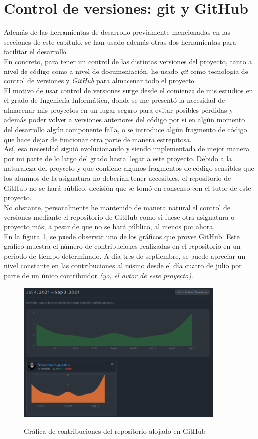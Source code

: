 \section{Control de versiones: git y GitHub}

Además de las herramientas de desarrollo previamente mencionadas en las secciones de este capítulo, se han usado además otras dos herramientas para facilitar el desarrollo.\\

En concreto, para tener un control de las distintas versiones del proyecto, tanto a nivel de código como a nivel de documentación, he usado \textit{git} como tecnología de control de versiones y \textit{GitHub} para almacenar todo el proyecto.\\

El motivo de usar control de versiones surge desde el comienzo de mis estudios en el grado de Ingeniería Informática, donde se me presentó la necesidad de almacenar mis proyectos en un lugar seguro para evitar posibles pérdidas y además poder volver a versiones anteriores del código por si en algún momento del desarrollo algún componente falla, o se introduce algún fragmento de código que hace dejar de funcionar otra parte de manera estrepitosa.\\

Así, esa necesidad siguió evolucionando y siendo implementada de mejor manera por mi parte de lo largo del grado hasta llegar a este proyecto. Debido a la naturaleza del proyecto y que contiene algunos fragmentos de código sensibles que los alumnos de la asignatura no deberían tener accesibles, el repositorio de GitHub no se hará público, decisión que se tomó en consenso con el tutor de este proyecto.\\

No obstante, personalmente he mantenido de manera natural el control de versiones mediante el repositorio de GitHub como si fuese otra asignatura o proyecto más, a pesar de que no se hará público, al menos por ahora.\\

En la figura \ref{img:github}, se puede observar uno de los gráficos que provee GitHub. Este gráfico muestra el número de contribuciones realizadas en el repositorio en un periodo de tiempo determinado. A día tres de septiembre, se puede apreciar un nivel constante en las contribuciones al mismo desde el día cuatro de julio por parte de un único contribuidor \textit{(yo, el autor de este proyecto)}.

\begin{figure}[h]
\centering
\includegraphics[width=0.9\textwidth]{logos/github.png}\\[1.4cm]
\caption{Gráfica de contribuciones del repositorio alojado en GitHub}
\label{img:github}
\end{figure}